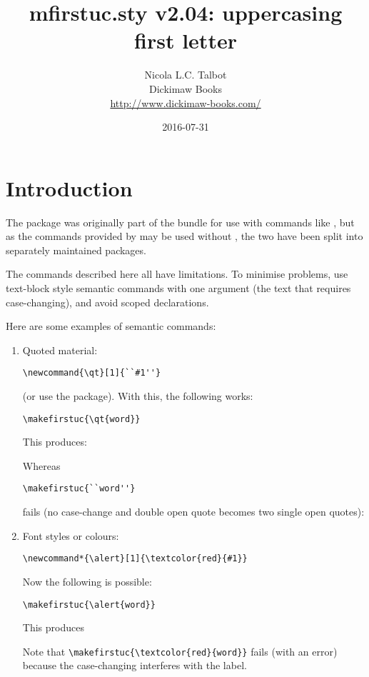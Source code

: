 \documentclass[report]{nlctdoc}
\begin{document}
\MakeShortVerb{|}
 \title{mfirstuc.sty v2.04: 
uppercasing first letter}
 \author{Nicola L.C. Talbot\\[10pt]
Dickimaw Books\\
\url{http://www.dickimaw-books.com/}}

 \date{2016-07-31}
 \maketitle
 \tableofcontents

 \chapter{Introduction}
 \label{sec:intro}

The  package was originally part of the
 bundle for use with commands like , but
as the commands provided by  may be used without
, the two have been split into separately
maintained packages.

\begin{important}
The commands described here all have limitations. To minimise
problems, use text-block style semantic commands with one argument
(the text that requires case-changing), and avoid scoped 
declarations.
\end{important}

Here are some examples of semantic commands:
\begin{enumerate}
\item Quoted material:
\begin{verbatim}
\newcommand{\qt}[1]{``#1''}
\end{verbatim}
(or use the  package). With this, the following
works:
\begin{verbatim}
\makefirstuc{\qt{word}}
\end{verbatim}
This produces:
\begin{display}
\end{display}
Whereas 
\begin{verbatim}
\makefirstuc{``word''}
\end{verbatim}
fails (no case-change and double open quote becomes two single open
quotes):
\begin{display}
\end{display}

\item Font styles or colours:
\begin{verbatim}
\newcommand*{\alert}[1]{\textcolor{red}{#1}}
\end{verbatim}
Now the following is possible:
\begin{verbatim}
\makefirstuc{\alert{word}}
\end{verbatim}
This produces
\begin{display}
\newcommand*{\alert}[1]{\textcolor{red}{#1}}%
\makefirstuc{\alert{word}}
\end{display}
Note that \verb|\makefirstuc{\textcolor{red}{word}}| fails
(with an error) because the case-changing interferes with the label.
\end{enumerate}
\end{document}
